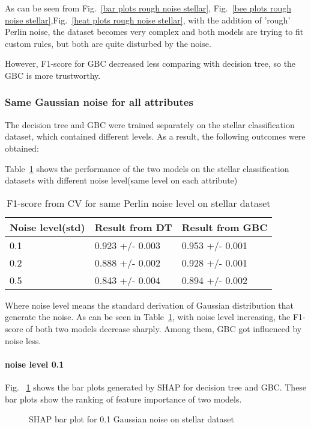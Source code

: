 \documentclass[runningheads,a4paper]{llncs}
\begin{document}
As can be seen from Fig.~\ref{bar plots rough noise stellar}, Fig.~\ref{bee plots rough noise stellar},Fig.~\ref{heat plots rough noise stellar}, with the addition of 'rough' Perlin noise, the dataset becomes very complex and both models are trying to fit custom rules, but both are quite disturbed by the noise.

However, F1-score for GBC decreased less comparing with decision tree, so the GBC is more trustworthy.

\subsubsection{Same Gaussian noise for all attributes}
The decision tree and GBC were trained separately on the stellar classification dataset, which contained different levels. As a result, the following outcomes were obtained:

Table~\ref{result from same stellar G} shows the performance of the two models on the stellar classification datasets with different noise level(same level on each attribute)

\begin{table}[H]
	\centering
	\caption{F1-score from CV for same Perlin noise level on stellar dataset}
	\label{result from same stellar G}
	\begin{tabular}{|l|l|l|}
		\hline
		Noise level(std) & Result from DT  &Result from GBC\\
		\hline
		0.1& 0.923 +/- 0.003& 0.953 +/- 0.001 \\
		0.2 & 0.888 +/- 0.002 & 0.928 +/- 0.001 \\
		0.5 & 0.843 +/- 0.004 & 0.894 +/- 0.002 \\
		\hline
	\end{tabular}
\end{table}

Where noise level means the standard derivation of Gaussian distribution that generate the noise.
As can be seen in Table~\ref{result from same stellar G}, with noise level increasing, the F1-score of both two models decrease sharply. Among them, GBC got influenced by noise less.

\paragraph{noise level 0.1}
Fig. ~\ref{bar plots 0.1 noise stellar} shows the bar plots generated by SHAP for decision tree and GBC. These bar plots show the ranking of feature importance of two models.
\begin{figure}[H]
	\centering
	
	\hfill
	
	
	\caption{SHAP bar plot for 0.1 Gaussian noise on stellar dataset}
	\label{bar plots 0.1 noise stellar}
\end{figure}
\end{document}
